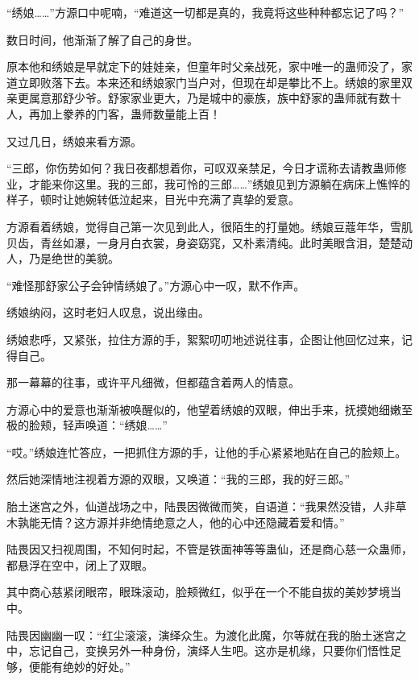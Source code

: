 \begin{this_body}
“绣娘……”方源口中呢喃，“难道这一切都是真的，我竟将这些种种都忘记了吗？”

数日时间，他渐渐了解了自己的身世。

原本他和绣娘是早就定下的娃娃亲，但童年时父亲战死，家中唯一的蛊师没了，家道立即败落下去。本来还和绣娘家门当户对，但现在却是攀比不上。绣娘的家里双亲更属意那舒少爷。舒家家业更大，乃是城中的豪族，族中舒家的蛊师就有数十人，再加上豢养的门客，蛊师数量能上百！

又过几日，绣娘来看方源。

“三郎，你伤势如何？我日夜都想着你，可叹双亲禁足，今日才谎称去请教蛊师修业，才能来你这里。我的三郎，我可怜的三郎……”绣娘见到方源躺在病床上憔悴的样子，顿时让她婉转低泣起来，目光中充满了真挚的爱意。

方源看着绣娘，觉得自己第一次见到此人，很陌生的打量她。绣娘豆蔻年华，雪肌贝齿，青丝如瀑，一身月白衣裳，身姿窈窕，又朴素清纯。此时美眼含泪，楚楚动人，乃是绝世的美貌。

“难怪那舒家公子会钟情绣娘了。”方源心中一叹，默不作声。

绣娘纳闷，这时老妇人叹息，说出缘由。

绣娘悲呼，又紧张，拉住方源的手，絮絮叨叨地述说往事，企图让他回忆过来，记得自己。

那一幕幕的往事，或许平凡细微，但都蕴含着两人的情意。

方源心中的爱意也渐渐被唤醒似的，他望着绣娘的双眼，伸出手来，抚摸她细嫩至极的脸颊，轻声唤道：“绣娘……”

“哎。”绣娘连忙答应，一把抓住方源的手，让他的手心紧紧地贴在自己的脸颊上。

然后她深情地注视着方源的双眼，又唤道：“我的三郎，我的好三郎。”

胎土迷宫之外，仙道战场之中，陆畏因微微而笑，自语道：“我果然没错，人非草木孰能无情？这方源并非绝情绝意之人，他的心中还隐藏着爱和情。”

陆畏因又扫视周围，不知何时起，不管是铁面神等等蛊仙，还是商心慈一众蛊师，都悬浮在空中，闭上了双眼。

其中商心慈紧闭眼帘，眼珠滚动，脸颊微红，似乎在一个不能自拔的美妙梦境当中。

陆畏因幽幽一叹：“红尘滚滚，演绎众生。为渡化此魔，尔等就在我的胎土迷宫之中，忘记自己，变换另外一种身份，演绎人生吧。这亦是机缘，只要你们悟性足够，便能有绝妙的好处。”

\end{this_body}

